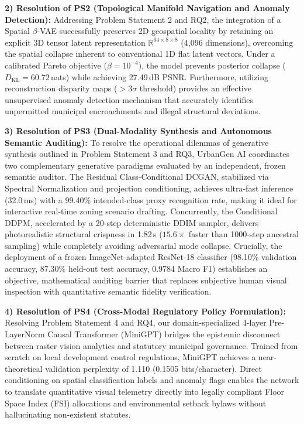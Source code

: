 \documentclass[journal]{IEEEtran}
\begin{document}
\noindent\textbf{2) Resolution of PS2 (Topological Manifold Navigation and Anomaly Detection):}
Addressing Problem Statement 2 and RQ2, the integration of a Spatial $\beta$-VAE successfully preserves 2D geospatial locality by retaining an explicit 3D tensor latent representation $\mathbb{R}^{64 \times 8 \times 8}$ (4,096 dimensions), overcoming the spatial collapse inherent to conventional 1D flat latent vectors. Under a calibrated Pareto objective ($\beta = 10^{-4}$), the model prevents posterior collapse ($D_{\text{KL}} = 60.72$\,nats) while achieving 27.49\,dB PSNR. Furthermore, utilizing reconstruction disparity maps ($>3\sigma$ threshold) provides an effective unsupervised anomaly detection mechanism that accurately identifies unpermitted municipal encroachments and illegal structural deviations.

\noindent\textbf{3) Resolution of PS3 (Dual-Modality Synthesis and Autonomous Semantic Auditing):}
To resolve the operational dilemmas of generative synthesis outlined in Problem Statement 3 and RQ3, UrbanGen AI coordinates two complementary generative paradigms evaluated by an independent, frozen semantic auditor. The Residual Class-Conditional DCGAN, stabilized via Spectral Normalization and projection conditioning, achieves ultra-fast inference (32.0\,ms) with a 99.40\% intended-class proxy recognition rate, making it ideal for interactive real-time zoning scenario drafting. Concurrently, the Conditional DDPM, accelerated by a 20-step deterministic DDIM sampler, delivers photorealistic structural crispness in 1.82\,s ($15.6\times$ faster than 1000-step ancestral sampling) while completely avoiding adversarial mode collapse. Crucially, the deployment of a frozen ImageNet-adapted ResNet-18 classifier (98.10\% validation accuracy, 87.30\% held-out test accuracy, 0.9784 Macro F1) establishes an objective, mathematical auditing barrier that replaces subjective human visual inspection with quantitative semantic fidelity verification.

\noindent\textbf{4) Resolution of PS4 (Cross-Modal Regulatory Policy Formulation):}
Resolving Problem Statement 4 and RQ4, our domain-specialized 4-layer Pre-LayerNorm Causal Transformer (MiniGPT) bridges the epistemic disconnect between raster vision analytics and statutory municipal governance. Trained from scratch on local development control regulations, MiniGPT achieves a near-theoretical validation perplexity of 1.110 (0.1505 bits/character). Direct conditioning on spatial classification labels and anomaly flags enables the network to translate quantitative visual telemetry directly into legally compliant Floor Space Index (FSI) allocations and environmental setback bylaws without hallucinating non-existent statutes.
\end{document}
